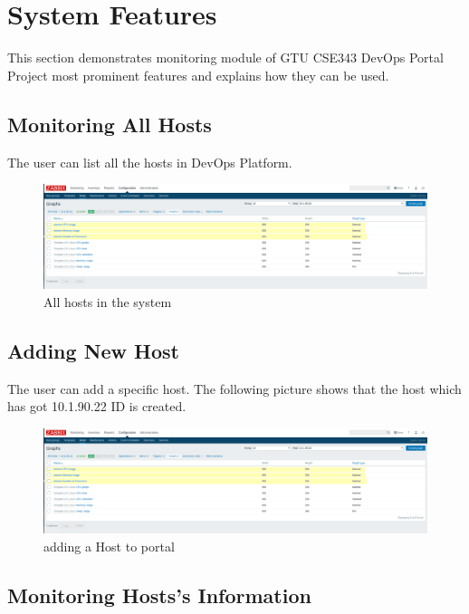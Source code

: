 \documentclass{article}
\begin{document}
\section{System Features}

This section demonstrates monitoring module of GTU CSE343 DevOps Portal Project most prominent features and explains how they can be used.


\subsection{Monitoring All Hosts}

The user  can list all the hosts in DevOps Platform. 

\begin{figure}[h]
\centering
\includegraphics[scale=0.3]{graphs_eklendi1}
\caption{All hosts in the system }
\end{figure}


\subsection{Adding New Host}

The user can add a specific host. The following picture shows that the host which has got 10.1.90.22 ID is created.

\begin{figure}[h]
\centering
\includegraphics[scale=0.3]{graphs_eklendi1}
\caption{adding a Host to portal}
\end{figure}



\subsection{ Monitoring Hosts’s Information}
\end{document}
